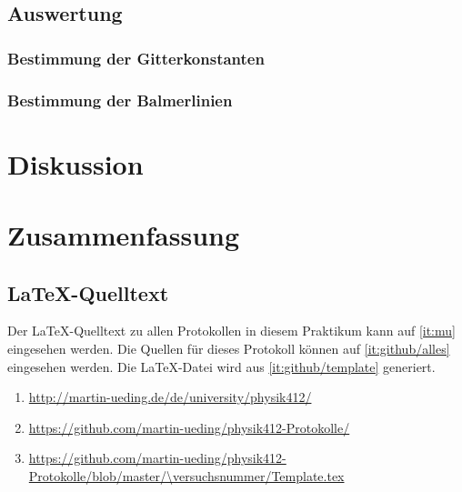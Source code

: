 \subsection{Auswertung}

\subsubsection{Bestimmung der Gitterkonstanten}

\subsubsection{Bestimmung der Balmerlinien}


\section{Diskussion}


\section{Zusammenfassung}


\begin{appendix}
    \section{\LaTeX-Quelltext}

    Der \LaTeX-Quelltext zu allen Protokollen in diesem Praktikum kann auf
    \ref{it:mu} eingesehen werden. Die Quellen für dieses Protokoll können auf
    \ref{it:github/alles} eingesehen werden. Die \LaTeX-Datei wird aus
    \ref{it:github/template} generiert.

    \begin{enumerate}
        \item
            \label{it:mu}
            \url{http://martin-ueding.de/de/university/physik412/}
        \item
            \label{it:github/alles}
            \url{https://github.com/martin-ueding/physik412-Protokolle/}
        \item
            \label{it:github/template}
            \url{https://github.com/martin-ueding/physik412-Protokolle/blob/master/\versuchsnummer/Template.tex}
    \end{enumerate}
\end{appendix}


